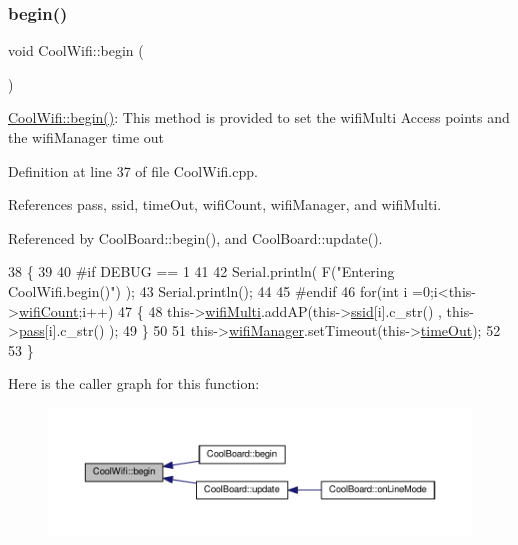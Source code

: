 \subsubsection{\texorpdfstring{begin()}{begin()}}
{\footnotesize\ttfamily void Cool\+Wifi\+::begin (\begin{DoxyParamCaption}{ }\end{DoxyParamCaption})}

\hyperlink{classCoolWifi_a46942fed90e475112cc10b78a32e7aaa}{Cool\+Wifi\+::begin()}\+: This method is provided to set the wifi\+Multi Access points and the wifi\+Manager time out 

Definition at line 37 of file Cool\+Wifi.\+cpp.



References pass, ssid, time\+Out, wifi\+Count, wifi\+Manager, and wifi\+Multi.



Referenced by Cool\+Board\+::begin(), and Cool\+Board\+::update().


\begin{DoxyCode}
38 \{ 
39 
40 \textcolor{preprocessor}{#if DEBUG == 1 }
41 
42     Serial.println( F(\textcolor{stringliteral}{"Entering CoolWifi.begin()"}) );
43     Serial.println();
44 
45 \textcolor{preprocessor}{#endif}
46     \textcolor{keywordflow}{for}(\textcolor{keywordtype}{int} i =0;i<this->\hyperlink{classCoolWifi_ab133bd92fcb895b884deecd6678592e4}{wifiCount};i++)
47     \{
48          this->\hyperlink{classCoolWifi_a7862a8c0d7239877e2956c14a368aab8}{wifiMulti}.addAP(this->\hyperlink{classCoolWifi_a893b21d0fed821438733bba2e73fb4c2}{ssid}[i].c\_str() , this->\hyperlink{classCoolWifi_a0c3332a149245aaad060b32593a54c9b}{pass}[i].c\_str() );    
49     \}
50     
51     this->\hyperlink{classCoolWifi_a80dd24fdc56e863f5eb9947dd65a433a}{wifiManager}.setTimeout(this->\hyperlink{classCoolWifi_a952111605f25156588b5632caaba1c6f}{timeOut});  
52     
53 \}
\end{DoxyCode}
Here is the caller graph for this function\+:\nopagebreak
\begin{figure}[H]
\begin{center}
\leavevmode
\includegraphics[width=350pt]{classCoolWifi_a46942fed90e475112cc10b78a32e7aaa_icgraph}
\end{center}
\end{figure}
\mbox{\label{classCoolWifi_a4eb2f6b9b09dd588964b88b6c70122c0}} 

